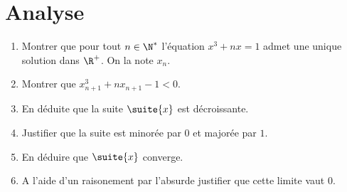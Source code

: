 \documentclass[a4paper, 11pt,reqno]{article}
\begin{document}
\section{Analyse}

\begin{exercice}
\begin{enumerate}
\item Montrer que pour tout $n\in \N^*$ l'équation $x^3+nx=1$ admet une unique solution dans $\R^+$. On la note $x_n$. 
\item Montrer que $x_{n+1}^3+n x_{n+1}-1<0$.
\item En déduite que la suite $\suite{x} $ est décroissante. 
\item Justifier que la suite est minorée par $0$ et majorée par $1$. 
\item En déduire que $\suite{x}$ converge. 
\item A l'aide d'un raisonement par l'absurde justifier que cette limite vaut $0$. 
\end{enumerate}
\end{exercice}
\end{document}
